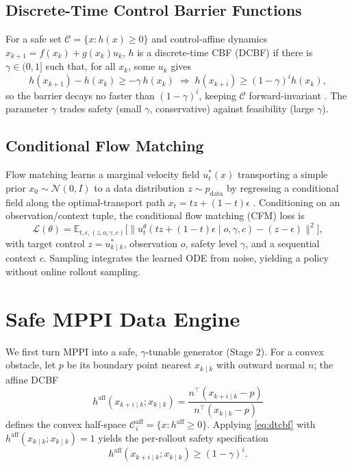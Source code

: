\documentclass[letterpaper, 10 pt, conference]{ieeeconf}
\begin{document}
\subsection{Discrete-Time Control Barrier Functions}
For a safe set $\mathcal C=\{x:h(x)\ge0\}$ and control-affine dynamics $x_{k+1}=f(x_k)+g(x_k)u_k$, $h$ is a discrete-time CBF (DCBF) if there is $\gamma\in(0,1]$ such that, for all $x_k$, some $u_k$ gives
\begin{equation}
h(x_{k+1})-h(x_k)\ge -\gamma\, h(x_k)\;\Longrightarrow\; h(x_{k+i})\ge (1-\gamma)^i h(x_k),
\label{eq:dtcbf}
\end{equation}
so the barrier decays no faster than $(1-\gamma)^i$, keeping $\mathcal C$ forward-invariant \cite{ames2014cbf, agrawal2017discrete}. The parameter $\gamma$ trades safety (small $\gamma$, conservative) against feasibility (large $\gamma$).

\subsection{Conditional Flow Matching}
Flow matching learns a marginal velocity field $u^*_t(x)$ transporting a simple prior $x_0\sim\mathcal N(0,I)$ to a data distribution $z\sim p_{\text{data}}$ by regressing a conditional field along the optimal-transport path $x_t=tz+(1-t)\epsilon$ \cite{lipman2022flow, lipman2024flow}. Conditioning on an observation/context tuple, the conditional flow matching (CFM) loss is
\begin{equation}
\mathcal L(\theta)=
\mathbb{E}_{t,\epsilon,(z,o,\gamma,c)}
\Big[\big\|u_t^\theta(tz{+}(1{-}t)\epsilon\mid o,\gamma,c)-(z-\epsilon)\big\|^2\Big],
\label{eq:cfm}
\end{equation}
with target control $z=u^*_{k\mid k}$, observation $o$, safety level $\gamma$, and a sequential context $c$. Sampling integrates the learned ODE from noise, yielding a policy without online rollout sampling.

\section{Safe MPPI Data Engine}\label{sec:planner}
We first turn MPPI into a safe, $\gamma$-tunable generator (Stage 2). For a convex obstacle, let $p$ be its boundary point nearest $x_{k\mid k}$ with outward normal $n$; the affine DCBF
\begin{equation}
h^{\mathrm{aff}}(x_{k+i\mid k};x_{k\mid k})=\frac{n^\top(x_{k+i\mid k}-p)}{n^\top(x_{k\mid k}-p)}
\label{eq:aff_barrier}
\end{equation}
defines the convex half-space $\mathcal C_i^{\mathrm{aff}}=\{x:h^{\mathrm{aff}}\ge0\}$. Applying \eqref{eq:dtcbf} with $h^{\mathrm{aff}}(x_{k\mid k};x_{k\mid k})=1$ yields the per-rollout safety specification
\begin{equation}
h^{\mathrm{aff}}(x_{k+i\mid k};x_{k\mid k})\ge (1-\gamma)^i.
\label{eq:safetyspec}
\end{equation}
\end{document}
